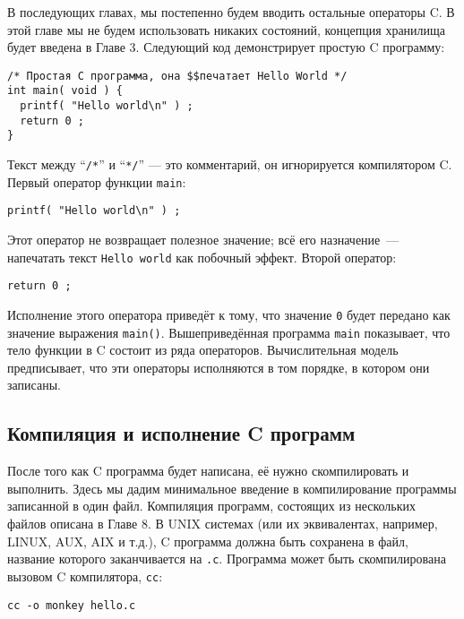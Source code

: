 В последующих главах, мы постепенно будем вводить остальные операторы C. В этой главе мы не будем использовать никаких состояний, концепция хранилища будет введена в Главе 3. Следующий код демонстрирует простую C программу:

\begin{lstlisting}
/* Простая C программа, она $$печатает Hello World */
int main( void ) {
  printf( "Hello world\n" ) ;
  return 0 ;
}
\end{lstlisting}

Текст между ``\lstinline|/*|'' и ``\lstinline|*/|'' --- это комментарий, он игнорируется компилятором C. Первый оператор функции \lstinline|main|:

\begin{lstlisting}
printf( "Hello world\n" ) ;
\end{lstlisting}

Этот оператор не возвращает полезное значение; всё его назначение~--- напечатать текст \lstinline|Hello world| как побочный эффект. Второй оператор:

\begin{lstlisting}
return 0 ;
\end{lstlisting}

Исполнение этого оператора приведёт к тому, что значение \lstinline|0| будет передано как значение выражения \lstinline|main()|. Вышеприведённая программа \lstinline|main| показывает, что тело функции в C состоит из ряда операторов. Вычислительная модель предписывает, что эти операторы исполняются в том порядке, в котором они записаны.

\subsection{Компиляция и исполнение C программ}\label{CompilingExecutingCProgram}

После того как C программа будет написана, её нужно скомпилировать и выполнить. Здесь мы дадим минимальное введение в компилирование программы записанной в один файл. Компиляция программ, состоящих из нескольких файлов описана в Главе 8. В UNIX системах (или их эквивалентах, например, LINUX, AUX, AIX и т.д.), C программа должна быть сохранена в файл, название которого заканчивается на \verb|.c|. Программа может быть скомпилирована вызовом C компилятора, \verb|cc|:

\begin{verbatim}
cc -o monkey hello.c
\end{verbatim}

